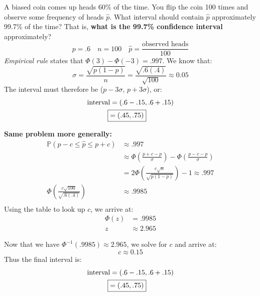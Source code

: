 \documentclass[titlepage, 12pt, leqno]{article}
\begin{document}
\begin{ex}
    A biased coin comes up heads 60\% of the time. You flip the coin 100 times and observe some frequency of heads $\hat p$. What interval should contain $\hat p$ approximately 99.7\% of the time? That is, \textbf{what is the 99.7\% confidence interval} approximately?
    \[
       p = .6 \quad n = 100 \quad \hat p = \frac{ \text{observed heads}}{100} 
    \]
   \textit{Empirical rule} states that $\Phi(3) - \Phi(-3) = .997$. We know that:
   \[
       \sigma = \frac{\sqrt{p(1-p)}}{n} = \frac{\sqrt{.6(.4)}}{\sqrt{100}} \approx 0.05
   \]
    The interval must therefore be ($p-3\sigma$, $p+3\sigma$), or:
   \begin{align*}
       \text{interval} &= (.6 - .15, .6 + .15) \\
       \Aboxed{&= (.45,.75)} 
   \end{align*}
\end{ex}
\begin{ex}
   \textbf{Same problem more generally:} 
    \begin{align*}
        \mathbb{P}(p-c \le \hat p \le p+c) &\approx .997 \\
                                           &\approx \Phi\left(\frac{p+c-p}{\sigma} \right) - \Phi\left(\frac{p-c-p}{\sigma} \right) \\
                                           &= 2\Phi\left(\frac{c\sqrt n}{\sqrt{p(1-p)}}\right) -1 \approx .997 \\
        \Phi\left(\frac{c\sqrt{100}}{\sqrt{.6(.4)}} \right) &\approx .9985 \\
    \end{align*}
    Using the table to look up $c$, we arrive at:
   \begin{align*}
       \Phi(z) &= .9985 \\
       z &\approx 2.965
   \end{align*}

   Now that we have $\Phi^{-1}(.9985) \approx 2.965$, we solve for $c$ and arrive at:
   \[
   c \approx 0.15
   \]
    Thus the final interval is:
   \begin{align*}
       \text{interval} &= (.6 - .15, .6 + .15) \\
       \Aboxed{&= (.45,.75)} 
   \end{align*}
\end{ex}
\end{document}
